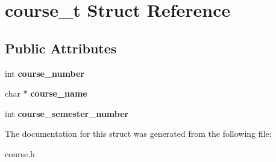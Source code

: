\hypertarget{structcourse__t}{}\section{course\+\_\+t Struct Reference}
\label{structcourse__t}
\subsection*{Public Attributes}
\begin{DoxyCompactItemize}
\item 
\mbox{\label{structcourse__t_af57c1b8e2fbb1d47afd585ccde82c0d5}} 
int {\bfseries course\+\_\+number}
\item 
\mbox{\label{structcourse__t_aeffc25f080aeda39c46ce44a2c4480dd}} 
char $\ast$ {\bfseries course\+\_\+name}
\item 
\mbox{\label{structcourse__t_aeca84eeff4cb0555913116dc5191be47}} 
int {\bfseries course\+\_\+semester\+\_\+number}
\end{DoxyCompactItemize}


The documentation for this struct was generated from the following file\+:\begin{DoxyCompactItemize}
\item 
course.\+h\end{DoxyCompactItemize}
